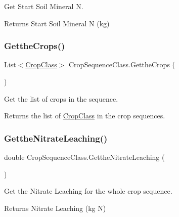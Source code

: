 Get Start Soil Mineral N. 

\begin{DoxyReturn}{Returns}
Start Soil Mineral N (kg) 
\end{DoxyReturn}
\mbox{\label{class_crop_sequence_class_a63762c38c16e0b0ebbf680ad1cf841d3}} 
\subsubsection{\texorpdfstring{GettheCrops()}{GettheCrops()}}
{\footnotesize\ttfamily List$<$\mbox{\hyperlink{class_crop_class}{Crop\+Class}}$>$ Crop\+Sequence\+Class.\+Getthe\+Crops (\begin{DoxyParamCaption}{ }\end{DoxyParamCaption})\hspace{0.3cm}{\ttfamily [inline]}}



Get the list of crops in the sequence. 

\begin{DoxyReturn}{Returns}
the list of \mbox{\hyperlink{class_crop_class}{Crop\+Class}} in the crop sequences. 
\end{DoxyReturn}
\mbox{\label{class_crop_sequence_class_a77ccfdb367dfd6a8ae9b92ae9ca9eed8}} 
\subsubsection{\texorpdfstring{GettheNitrateLeaching()}{GettheNitrateLeaching()}\hspace{0.1cm}{\footnotesize\ttfamily [1/2]}}
{\footnotesize\ttfamily double Crop\+Sequence\+Class.\+Getthe\+Nitrate\+Leaching (\begin{DoxyParamCaption}{ }\end{DoxyParamCaption})\hspace{0.3cm}{\ttfamily [inline]}}



Get the Nitrate Leaching for the whole crop sequence. 

\begin{DoxyReturn}{Returns}
Nitrate Leaching (kg N) 
\end{DoxyReturn}
\mbox{\label{class_crop_sequence_class_a1f7dcd7a44facc951bfea675eca18c9f}} 
